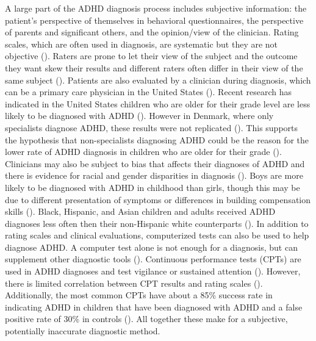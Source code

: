 \documentclass[,article,,moreauthors,pdftex]{mdpi}
\begin{document}
A large part of the ADHD diagnosis process includes subjective
information: the patient's perspective of themselves in behavioral
questionnaires, the perspective of parents and significant others, and
the opinion/view of the clinician. Rating scales, which are often used
in diagnosis, are systematic but they are not objective
(\citet{gualtieri_adhd_2005}). Raters are prone to let their view of the
subject and the outcome they want skew their results and different
raters often differ in their view of the same subject
(\citet{gualtieri_adhd_2005}). Patients are also evaluated by a
clinician during diagnosis, which can be a primary care physician in the
United States (\citet{contributors_diagnosing_nodate}). Recent research
has indicated in the United States children who are older for their
grade level are less likely to be diagnosed with ADHD
(\citet{dalsgaard_relative_2012}). However in Denmark, where only
specialists diagnose ADHD, these results were not replicated
(\citet{dalsgaard_relative_2012}). This supports the hypothesis that
non-specialists diagnosing ADHD could be the reason for the lower rate
of ADHD diagnosis in children who are older for their grade
(\citet{dalsgaard_relative_2012}). Clinicians may also be subject to
bias that affects their diagnoses of ADHD and there is evidence for
racial and gender disparities in diagnosis (\citet{noauthor_what_2022}).
Boys are more likely to be diagnosed with ADHD in childhood than girls,
though this may be due to different presentation of symptoms or
differences in building compensation skills
(\citet{noauthor_what_2022}). Black, Hispanic, and Asian children and
adults received ADHD diagnoses less often then their non-Hispanic white
counterparts (\citet{noauthor_what_2022}). In addition to rating scales
and clinical evaluations, computerized tests can also be used to help
diagnose ADHD. A computer test alone is not enough for a diagnosis, but
can supplement other diagnostic tools (\citet{gualtieri_adhd_2005}).
Continuous performance tests (CPTs) are used in ADHD diagnoses and test
vigilance or sustained attention (\citet{gualtieri_adhd_2005}). However,
there is limited correlation between CPT results and rating scales
(\citet{gualtieri_adhd_2005}). Additionally, the most common CPTs have
about a 85\% success rate in indicating ADHD in children that have been
diagnosed with ADHD and a false positive rate of 30\% in controls
(\citet{gualtieri_adhd_2005}). All together these make for a subjective,
potentially inaccurate diagnostic method.
\end{document}
